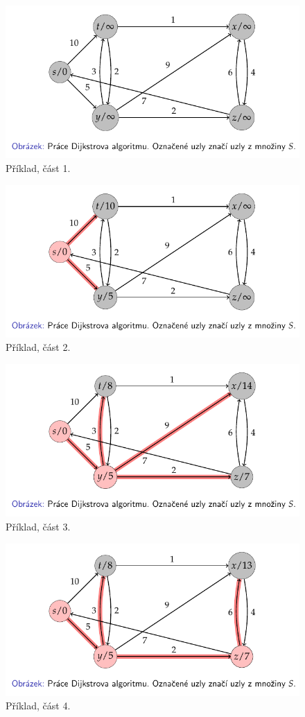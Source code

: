 \begin{figure}[H]
    \centering
    \includegraphics[width=0.80\linewidth]{example_dijkstra_p1.pdf}
    \caption{Příklad, část 1.}
\end{figure}

\begin{figure}[H]
    \centering
    \includegraphics[width=0.80\linewidth]{example_dijkstra_p2.pdf}
    \caption{Příklad, část 2.}
\end{figure}

\begin{figure}[H]
    \centering
    \includegraphics[width=0.80\linewidth]{example_dijkstra_p3.pdf}
    \caption{Příklad, část 3.}
\end{figure}

\begin{figure}[H]
    \centering
    \includegraphics[width=0.80\linewidth]{example_dijkstra_p4.pdf}
    \caption{Příklad, část 4.}
\end{figure}

